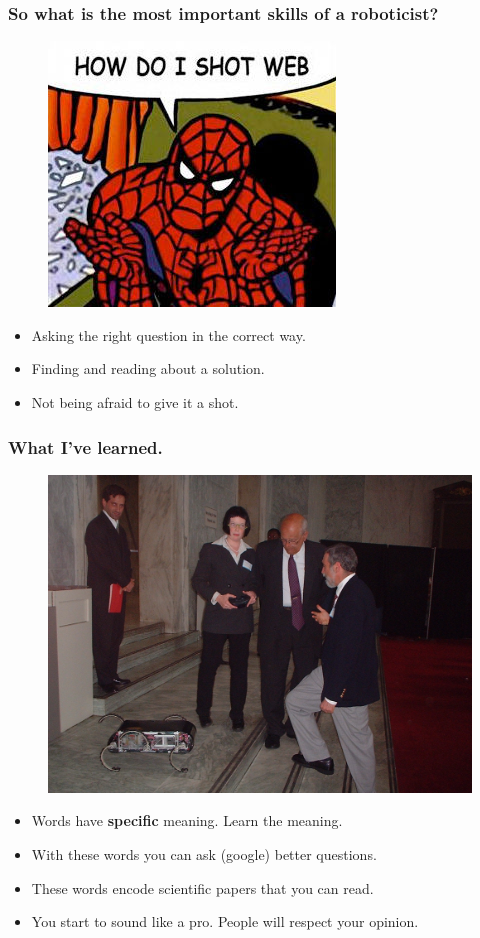 \documentclass[compress]{beamer}
\begin{document}
\begin{frame}
   \frametitle{So what is the most important skills of a roboticist?}
   \begin{figure}
     \includegraphics[width=0.5\linewidth]{howdoishotweb.jpg}
   \end{figure}

   \begin{itemize}
     \item Asking the right question in the correct way.
     \item Finding and reading about a solution.
     \item Not being afraid to give it a shot.
   \end{itemize}
 \end{frame}

\begin{frame}
   \frametitle{What I've learned.}
   \begin{figure}
     \includegraphics[width=0.5\linewidth]{youngkat.jpg}
   \end{figure}

   \begin{itemize}
     \item Words have \textbf{specific} meaning. Learn the meaning.
     \item With these words you can ask (google) better questions. 
     \item These words encode scientific papers that you can read.
     \item You start to sound like a pro. People will respect your opinion.
   \end{itemize}
 \end{frame}
\end{document}
